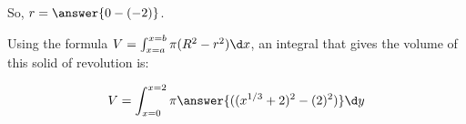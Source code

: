 \documentclass{ximera}
\begin{document}
\begin{exercise}
\begin{exercise}
\begin{exercise}
\begin{exercise}
\begin{multipleChoice}
\end{multipleChoice} 

So, $r= \answer{0-(-2)}$.


\begin{exercise}
Using the formula $V = \int_{x=a}^{x=b} \pi (R^2-r^2) \d x$, an integral that gives the volume of this solid of revolution is:

\[
V = \int_{x=0}^{x=2} \pi \answer{((x^{1/3}+2)^2-(2)^2)} \d y
\]

\end{exercise}
\end{exercise}    
\end{exercise}
\end{exercise}
\end{exercise}

\end{document}

